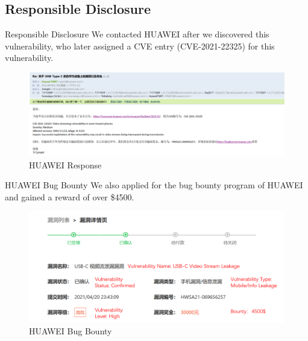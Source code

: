 \documentclass{beamer}
\begin{document}
\subsection{Responsible Disclosure}
\begin{frame}{Responsible Disclosure}
	We contacted HUAWEI after we discovered this vulnerability, who later assigned a CVE entry (CVE-2021-22325) for this vulnerability. 
	\begin{figure}
		\centering
		\includegraphics[width=\linewidth]{Figs/huawei_response.png}
		\caption*{HUAWEI Response}
	\end{figure}
\end{frame}
\begin{frame}{HUAWEI Bug Bounty}
We also applied for the bug bounty program of HUAWEI and gained a reward of over \$4500.
	\begin{figure}
		\centering
		\includegraphics[width=\linewidth]{Figs/bounty.png}
		\caption*{HUAWEI Bug Bounty}
	\end{figure}
\end{frame}
\end{document}
